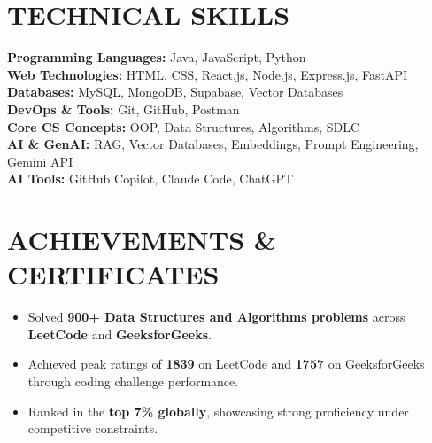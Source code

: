 \documentclass[letterpaper,11pt]{article}
\newcommand{\resumeItem}[1]{
  \item\small{
    {#1 \vspace{-2pt}}
  }
}
\newcommand{\resumeItemListStart}{\begin{itemize}}
\newcommand{\resumeItemListEnd}{\end{itemize}\vspace{-5pt}}
\begin{document}
\vspace{-0.3cm}


\section{\textbf{\sffamily TECHNICAL SKILLS}}
\begin{itemize}[leftmargin=0.15in, label={}]
  \small{\item{
    \textbf{\sffamily Programming Languages:} \sffamily \normalsize Java, JavaScript, Python  \\[0.1em]

    \textbf{\sffamily Web Technologies:} \sffamily HTML, CSS, React.js, Node.js, Express.js, FastAPI\\[0.1em]

    \textbf{\sffamily Databases:} \sffamily MySQL, MongoDB, Supabase, Vector Databases \\[0.1em]

    \textbf{\sffamily DevOps \& Tools:} \sffamily Git, GitHub, Postman \\[0.1em]

    \textbf{\sffamily Core CS Concepts:} \sffamily OOP, Data Structures, Algorithms, SDLC \\[0.1em]

    \textbf{\sffamily AI \& GenAI:} \sffamily RAG, Vector Databases, Embeddings, Prompt Engineering, Gemini API \\[0.1em]

    \textbf{\sffamily AI Tools:} \sffamily GitHub Copilot, Claude Code, ChatGPT \\
  }}
\end{itemize}
\vspace{-10pt}




\section{\textbf{\sffamily ACHIEVEMENTS \& CERTIFICATES}}
\resumeItemListStart
\setlength{\itemsep}{1pt}
    \resumeItem{\sffamily \normalsize{Solved \textbf{900+ Data Structures and Algorithms problems} across \textbf{LeetCode} and \textbf{GeeksforGeeks}.    }}
\vspace{0.12cm}
    \resumeItem{\sffamily \normalsize{Achieved peak ratings of \textbf{1839} on LeetCode and \textbf{1757} on GeeksforGeeks through coding challenge performance.}}
\vspace{0.12cm}
    \resumeItem{\sffamily \normalsize{Ranked in the \textbf{top 7\% globally}, showcasing strong proficiency under competitive constraints.}}
\resumeItemListEnd
\end{document}
